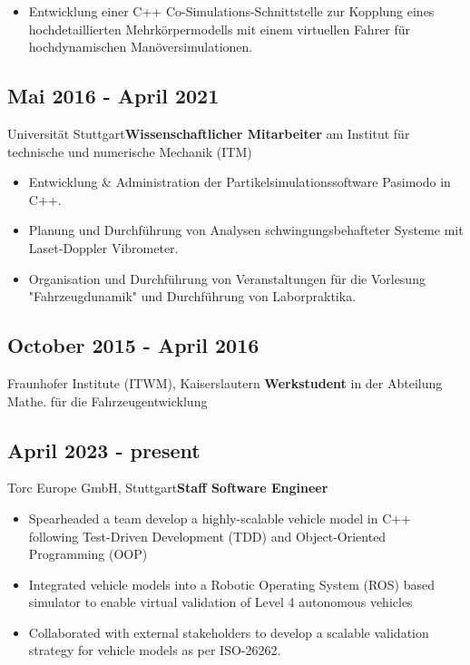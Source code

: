 \documentclass{mycv}
\begin{document}
\begin{paracol}{2}
{\begin{itemize}
               \item Entwicklung einer C++ Co-Simulations-Schnittstelle zur
                   Kopplung eines hochdetaillierten Mehrk{\"o}rpermodells mit
                   einem virtuellen Fahrer für hochdynamischen
                   Man{\"o}versimulationen.
           \end{itemize}

        \subsection{Mai 2016 - April 2021}{Universit{\"a}t
            Stuttgart}{{\bfseries Wissenschaftlicher Mitarbeiter} am Institut f{\"u}r
            technische und numerische Mechanik (ITM)}
           \begin{itemize}
               \item Entwicklung \& Administration der Partikelsimulationssoftware
                   Pasimodo in C++.
               \item Planung und Durchf{\"u}hrung von Analysen
                   schwingungsbehafteter Systeme mit Laset-Doppler Vibrometer.
               \item Organisation und Durchf{\"u}hrung von Veranstaltungen f{\"u}r
                   die Vorlesung "Fahrzeugdunamik" und Durchf{\"u}hrung von
                   Laborpraktika.
           \end{itemize}

        \subsection{October 2015 - April 2016}{Fraunhofer Institute (ITWM), Kaiserslautern}
            {{\bfseries Werkstudent} in der Abteilung Mathe. für die Fahrzeugentwicklung}\\
}
{
    \subsection{April 2023 - present}{Torc Europe GmbH, Stuttgart}{{\bfseries Staff Software Engineer}}
          \begin{itemize}
            \item Spearheaded a team develop a highly-scalable
                vehicle model in C++ following Test-Driven Development
                (TDD) and Object-Oriented Programming (OOP)
            \item Integrated vehicle models into a Robotic Operating System (ROS)
                based simulator to enable virtual validation of Level 4
                autonomous vehicles
            \item 
                Collaborated with external stakeholders to develop a scalable
                validation strategy for vehicle models as per
                ISO-26262.
          \end{itemize}
    
}
\end{paracol}
\end{document}

